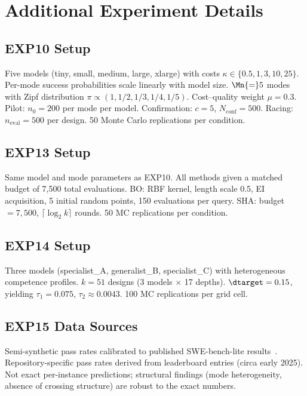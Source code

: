 \section{Additional Experiment Details}
\label{app:experiments}

\subsection{EXP10 Setup}

Five models (tiny, small, medium, large, xlarge) with costs
$\kappa \in \{0.5, 1, 3, 10, 25\}$.
Per-mode success probabilities scale linearly with model size.
$\Mn{=}5$ modes with Zipf distribution
$\pi \propto (1, 1/2, 1/3, 1/4, 1/5)$.
Cost--quality weight $\mu = 0.3$.
Pilot: $n_0 = 200$ per mode per model.
Confirmation: $c = 5$, $N_{\mathrm{conf}} = 500$.
Racing: $n_{\mathrm{eval}} = 500$ per design.
50 Monte Carlo replications per condition.

\subsection{EXP13 Setup}

Same model and mode parameters as EXP10.
All methods given a matched budget of 7,500 total evaluations.
BO: RBF kernel, length scale 0.5, EI acquisition, 5 initial random
points, 150 evaluations per query.
SHA: budget $= 7{,}500$, $\lceil\log_2 k\rceil$ rounds.
50 MC replications per condition.

\subsection{EXP14 Setup}

Three models (specialist\_A, generalist\_B, specialist\_C) with
heterogeneous competence profiles.
$k = 51$ designs (3 models $\times$ 17 depths).
$\dtarget = 0.15$, yielding $\tau_1 = 0.075$, $\tau_2 \approx 0.0043$.
100 MC replications per grid cell.

\subsection{EXP15 Data Sources}

Semi-synthetic pass rates calibrated to published SWE-bench-lite
results~\citep{jimenez2024swebench}.
Repository-specific pass rates derived from leaderboard entries
(circa early 2025).
Not exact per-instance predictions; structural findings (mode
heterogeneity, absence of crossing structure) are robust to the
exact numbers.
